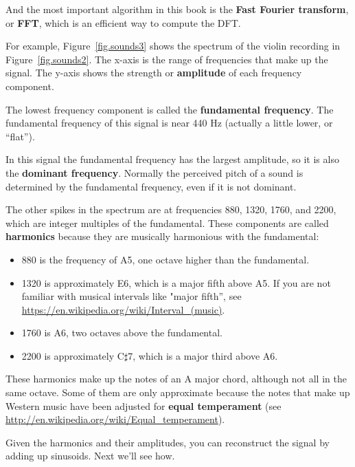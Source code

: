\documentclass[12pt]{book}
\begin{document}
And the most important algorithm in this book is the {\bf Fast
Fourier transform}, or {\bf FFT}, which is an efficient way to
compute the DFT.

For example, Figure~\ref{fig.sounds3} shows the spectrum of the violin
recording in Figure~\ref{fig.sounds2}.  The x-axis is the range of
frequencies that make up the signal.  The y-axis shows the strength
or {\bf amplitude} of each frequency component.

The lowest frequency component is called the {\bf fundamental
  frequency}.  The fundamental frequency of this signal is near 440 Hz
(actually a little lower, or ``flat'').

In this signal the fundamental frequency has the largest amplitude,
so it is also the {\bf dominant frequency}.
Normally the perceived pitch of a sound is determined by the
fundamental frequency, even if it is not dominant. 

The other spikes in the spectrum are at frequencies 880, 1320, 1760, and
2200, which are integer multiples of the fundamental.
These components are called {\bf harmonics} because they are
musically harmonious with the fundamental:

\begin{itemize}

\item 880 is the frequency of A5, one octave higher than the fundamental.  

\item 1320 is approximately E6, which is a major fifth above A5.
  If you are not familiar with musical intervals like "major fifth'', see
  \url{https://en.wikipedia.org/wiki/Interval_(music)}.

\item 1760 is A6, two octaves above the fundamental. 

\item 2200 is approximately C$\sharp$7, which is a major third
above A6.

\end{itemize}

These harmonics make up the notes of an A major
chord, although not all in the same octave.  Some of them are only
approximate because the notes that make up Western music have been
adjusted for {\bf equal temperament} (see
 \url{http://en.wikipedia.org/wiki/Equal_temperament}).

Given the harmonics and their amplitudes, you can reconstruct the
signal by adding up sinusoids.  
Next we'll see how.
\end{document}
